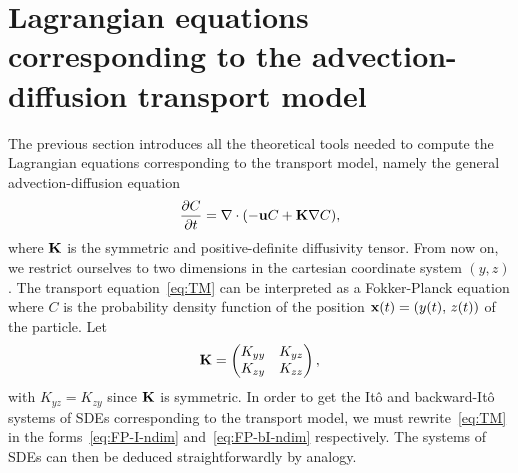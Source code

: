 \section{Lagrangian equations corresponding to the advection-diffusion transport model}
The previous section introduces all the theoretical tools needed to compute the Lagrangian equations corresponding to the transport model, namely the general advection-diffusion equation
\begin{equation} \label{eq:TM}
	\frac{\partial C}{\partial t} = \nabla \cdot (-\mathbf u C + \mathbf K \nabla C),
\end{equation}
where $\mathbf K$ is the symmetric and positive-definite diffusivity tensor.
From now on, we restrict ourselves to two dimensions in the cartesian coordinate system $(y,z)$. 
The transport equation~\eqref{eq:TM} can be interpreted as a Fokker-Planck equation where $C$ is the probability density function of the position $\mathbf x(t) = (y(t),\,z(t))$ of the particle. Let
\begin{equation}
	\mathbf K = \begin{pmatrix} K_{yy} & K_{yz}\\ K_{zy} & K_{zz} \end{pmatrix},
\end{equation}
with $K_{yz} = K_{zy}$ since $\mathbf K$ is symmetric. In order to get the Itô and backward-Itô systems of SDEs corresponding to the transport model, we must rewrite~\eqref{eq:TM} in the forms~\eqref{eq:FP-I-ndim} and~\eqref{eq:FP-bI-ndim} respectively. The systems of SDEs can then be deduced straightforwardly by analogy.

